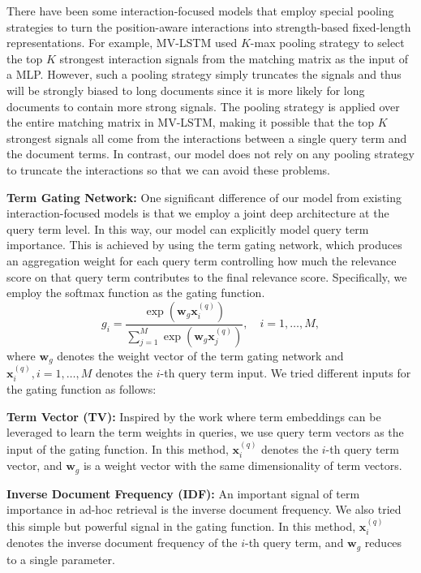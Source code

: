 \documentclass{sig-alternate-05-2015}
\begin{document}
There have been some interaction-focused models that employ special pooling strategies to turn the position-aware interactions into strength-based fixed-length representations. For example, MV-LSTM \cite{wan2015deep} used $K$-max pooling strategy \cite{kalchbrenner2014convolutional} to select the top $K$ strongest interaction signals from the matching matrix as the input of a MLP. However, such a pooling strategy simply truncates the signals and thus will be strongly biased to long documents since it is more likely for long documents to contain more strong signals. The pooling strategy is applied over the entire matching matrix in MV-LSTM, making it possible that the top $K$ strongest signals all come from the interactions between a single query term and the document terms. In contrast, our model does not rely on any pooling strategy to truncate the interactions so that we can avoid these problems.

\textbf{Term Gating Network:} One significant difference of our model from existing interaction-focused models is that we employ a joint deep architecture at the query term level. In this way, our model can explicitly model query term importance. This is achieved by using the term gating network, which produces an aggregation weight for each query term controlling how much the relevance score on that query term contributes to the final relevance score. Specifically, we employ the softmax function as the gating function.
\begin{displaymath}
g_i=\frac{\exp(\boldsymbol{w}_g\boldsymbol{x}^{(q)}_i)}{\sum_{j=1}^{M}\exp(\boldsymbol{w}_g\boldsymbol{x}^{(q)}_j)}, \quad i=1,\dots,M,
\end{displaymath}
where $\boldsymbol{w}_g$ denotes the weight vector of the term gating network and $\boldsymbol{x}^{(q)}_i, i=1,\dots,M$ denotes the $i$-th query term input. We tried different inputs for the gating function as follows:

\textbf{Term Vector (TV):} Inspired by the work \cite{zheng2015learning} where term embeddings can be leveraged to learn the term weights in queries, we use query term vectors as the input of the gating function. In this method, $\boldsymbol{x}^{(q)}_i$ denotes the $i$-th query term vector, and $\boldsymbol{w}_g$ is a weight vector with the same dimensionality of term vectors.

\textbf{Inverse Document Frequency (IDF):} An important signal of term importance in ad-hoc retrieval is the inverse document frequency. We also tried this simple but powerful signal in the gating function. In this method, $\boldsymbol{x}^{(q)}_i$ denotes the inverse document frequency of the $i$-th query term, and $\boldsymbol{w}_g$ reduces to a single parameter.
\end{document}
